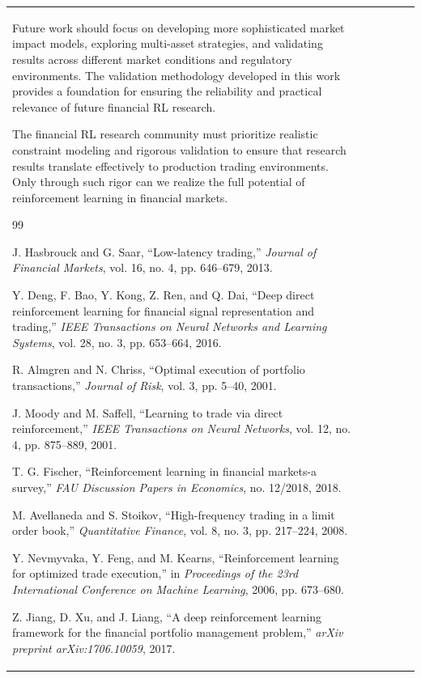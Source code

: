 \documentclass[11pt,a4paper]{article}
\begin{document}
\begin{table}[h]
\begin{tabular}{|l|c|c|c|c|c|}
Future work should focus on developing more sophisticated market impact models, exploring multi-asset strategies, and validating results across different market conditions and regulatory environments. The validation methodology developed in this work provides a foundation for ensuring the reliability and practical relevance of future financial RL research.

The financial RL research community must prioritize realistic constraint modeling and rigorous validation to ensure that research results translate effectively to production trading environments. Only through such rigor can we realize the full potential of reinforcement learning in financial markets.
\n\n
\begin{thebibliography}{99}

\bibitem{hasbrouck2013low}
J. Hasbrouck and G. Saar, ``Low-latency trading,'' \emph{Journal of Financial Markets}, vol. 16, no. 4, pp. 646--679, 2013.

\bibitem{deng2016deep}
Y. Deng, F. Bao, Y. Kong, Z. Ren, and Q. Dai, ``Deep direct reinforcement learning for financial signal representation and trading,'' \emph{IEEE Transactions on Neural Networks and Learning Systems}, vol. 28, no. 3, pp. 653--664, 2016.

\bibitem{almgren2001optimal}
R. Almgren and N. Chriss, ``Optimal execution of portfolio transactions,'' \emph{Journal of Risk}, vol. 3, pp. 5--40, 2001.

\bibitem{moody2001learning}
J. Moody and M. Saffell, ``Learning to trade via direct reinforcement,'' \emph{IEEE Transactions on Neural Networks}, vol. 12, no. 4, pp. 875--889, 2001.

\bibitem{fischer2018reinforcement}
T. G. Fischer, ``Reinforcement learning in financial markets-a survey,'' \emph{FAU Discussion Papers in Economics}, no. 12/2018, 2018.

\bibitem{avellaneda2008high}
M. Avellaneda and S. Stoikov, ``High-frequency trading in a limit order book,'' \emph{Quantitative Finance}, vol. 8, no. 3, pp. 217--224, 2008.

\bibitem{nevmyvaka2006reinforcement}
Y. Nevmyvaka, Y. Feng, and M. Kearns, ``Reinforcement learning for optimized trade execution,'' in \emph{Proceedings of the 23rd International Conference on Machine Learning}, 2006, pp. 673--680.

\bibitem{jiang2017deep}
Z. Jiang, D. Xu, and J. Liang, ``A deep reinforcement learning framework for the financial portfolio management problem,'' \emph{arXiv preprint arXiv:1706.10059}, 2017.


\end{thebibliography}
\end{tabular}
\end{table}
\end{document}
